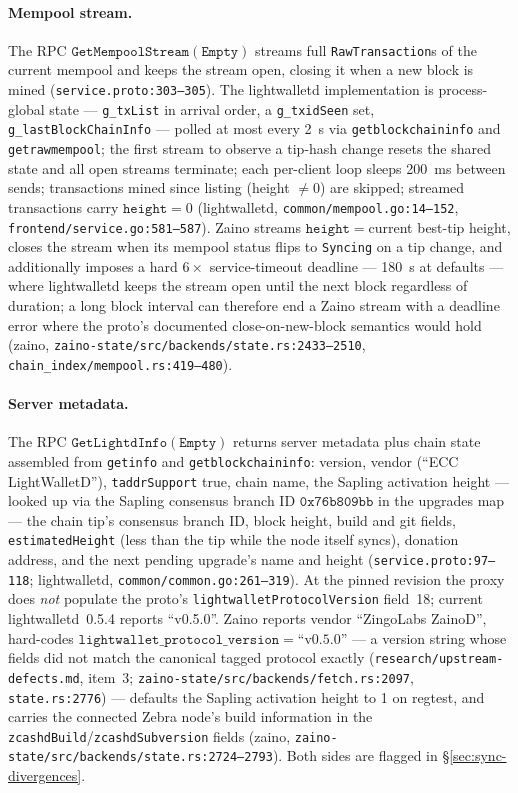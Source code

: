 \documentclass[11pt,a4paper]{article}
\theoremstyle{definition}
\begin{document}
\paragraph{Mempool stream.} The RPC
$\mathtt{GetMempoolStream}(\mathtt{Empty})$ streams full
\texttt{RawTransaction}s of the current mempool and keeps the stream
open, closing it when a new block is mined
(\texttt{service.proto:303--305}). The lightwalletd implementation is
process-global state --- \texttt{g\_txList} in arrival order, a
\texttt{g\_txidSeen} set, \texttt{g\_lastBlockChainInfo} --- polled at
most every 2~s via \texttt{getblockchaininfo} and
\texttt{getrawmempool}; the first stream to observe a tip-hash change
resets the shared state and all open streams terminate; each per-client
loop sleeps 200~ms between sends; transactions mined since listing
(height $\neq 0$) are skipped; streamed transactions carry
$\mathtt{height} = 0$ (\textsf{lightwalletd},
\texttt{common/mempool.go:14--152},
\texttt{frontend/service.go:581--587}). Zaino streams
$\mathtt{height} = {}$current best-tip height, closes the stream when its
mempool status flips to \texttt{Syncing} on a tip change, and
additionally imposes a hard $6 \times$ service-timeout deadline ---
180~s at defaults --- where lightwalletd keeps the stream open until the
next block regardless of duration; a long block interval can therefore
end a Zaino stream with a deadline error where the proto's documented
close-on-new-block semantics would hold (\textsf{zaino},
\texttt{zaino-state/src/backends/state.rs:2433--2510},
\texttt{chain\_index/mempool.rs:419--480}).

\paragraph{Server metadata.} The RPC
$\mathtt{GetLightdInfo}(\mathtt{Empty})$ returns server metadata plus
chain state assembled from \texttt{getinfo} and
\texttt{getblockchaininfo}: version, vendor (``ECC LightWalletD''),
\texttt{taddrSupport} true, chain name, the Sapling activation height ---
looked up via the Sapling consensus branch ID $\mathtt{0x76b809bb}$ in
the upgrades map --- the chain tip's consensus branch ID, block height,
build and git fields, \texttt{estimatedHeight} (less than the tip while
the node itself syncs), donation address, and the next pending upgrade's
name and height (\texttt{service.proto:97--118}; \textsf{lightwalletd},
\texttt{common/common.go:261--319}). At the pinned revision the proxy does
\emph{not} populate the proto's \texttt{lightwalletProtocolVersion}
field~18; current \textsf{lightwalletd}~0.5.4 reports ``v0.5.0''. Zaino
reports vendor ``ZingoLabs ZainoD'', hard-codes
$\mathtt{lightwallet\_protocol\_version} = \text{``v0.5.0''}$ --- a
version string whose fields did not match the canonical tagged protocol
exactly
(\texttt{research/upstream-defects.md}, item~3;
\texttt{zaino-state/src/backends/fetch.rs:2097},
\texttt{state.rs:2776}) --- defaults the Sapling activation height to 1
on regtest, and
carries the connected Zebra node's build information in the
\texttt{zcashdBuild}/\allowbreak\texttt{zcashdSubversion} fields
(\textsf{zaino},
\texttt{zaino-state/src/backends/\allowbreak state.rs:2724--2793}). Both
sides are flagged in \S\ref{sec:sync-divergences}.
\end{document}
